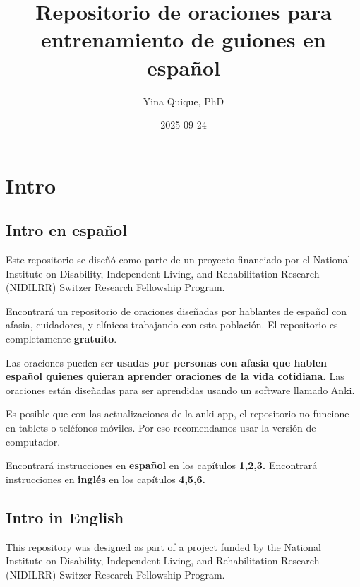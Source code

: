 \documentclass[
]{book}
\title{Repositorio de oraciones para entrenamiento de guiones en español}
\author{Yina Quique, PhD}
\date{2025-09-24}
\begin{document}
\maketitle

{
\setcounter{tocdepth}{1}
\tableofcontents
}
\chapter*{Intro}\label{intro}

\section*{\texorpdfstring{\textbf{Intro en español}}{Intro en español}}\label{intro-en-espauxf1ol}

Este repositorio se diseñó como parte de un proyecto financiado por el National Institute on Disability, Independent Living, and Rehabilitation Research (NIDILRR) Switzer Research Fellowship Program.

Encontrará un repositorio de oraciones diseñadas por hablantes de español con afasia, cuidadores, y clínicos trabajando con esta población. El repositorio es completamente \textbf{gratuito}.

Las oraciones pueden ser \textbf{usadas por personas con afasia que hablen español quienes quieran aprender oraciones de la vida cotidiana.} Las oraciones están diseñadas para ser aprendidas usando un software llamado Anki.

Es posible que con las actualizaciones de la anki app, el repositorio no funcione en tablets o teléfonos móviles. Por eso recomendamos usar la versión de computador.

Encontrará instrucciones en \textbf{español} en los capítulos \textbf{1,2,3.}
Encontrará instrucciones en \textbf{inglés} en los capítulos \textbf{4,5,6.}

\section*{\texorpdfstring{\textbf{Intro in English}}{Intro in English}}\label{intro-in-english}

This repository was designed as part of a project funded by the National Institute on Disability, Independent Living, and Rehabilitation Research (NIDILRR) Switzer Research Fellowship Program.
\end{document}

